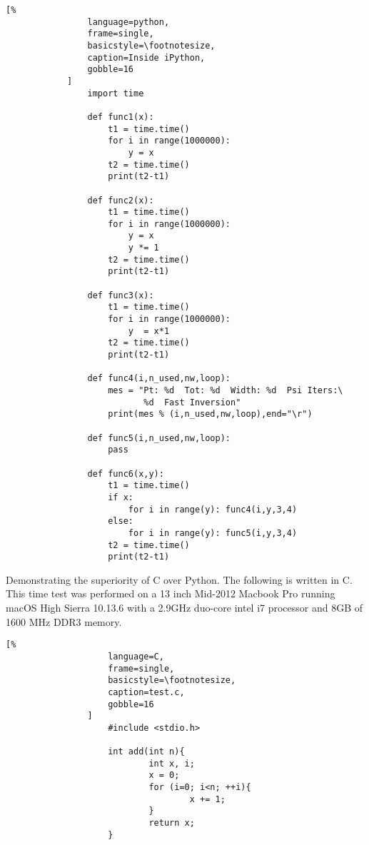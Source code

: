 \documentclass[crop=false,class=article,oneside]{standalone}
\begin{document}
            \begin{lstlisting}[%
                language=python,
                frame=single,
                basicstyle=\footnotesize,
                caption=Inside iPython,
                gobble=16
            ]
                import time
                
                def func1(x):
                	t1 = time.time()
                	for i in range(1000000):
                		y = x
                	t2 = time.time()
                	print(t2-t1)
                
                def func2(x):
                	t1 = time.time()
                	for i in range(1000000):
                		y = x
                		y *= 1
                	t2 = time.time()
                	print(t2-t1)
                
                def func3(x):
                    t1 = time.time()
                    for i in range(1000000):
                        y  = x*1
                    t2 = time.time()
                    print(t2-t1)
                
                def func4(i,n_used,nw,loop):
                    mes = "Pt: %d  Tot: %d  Width: %d  Psi Iters:\
                           %d  Fast Inversion"
                    print(mes % (i,n_used,nw,loop),end="\r")
                
                def func5(i,n_used,nw,loop):
                	pass
                
                def func6(x,y):
                	t1 = time.time()
                	if x:
                		for i in range(y): func4(i,y,3,4)
                	else:
                		for i in range(y): func5(i,y,3,4)
                	t2 = time.time()
                	print(t2-t1)
            \end{lstlisting}
            Demonstrating the superiority of C over Python.
            The following is written in C. This time test was
            performed on a 13 inch Mid-2012 Macbook Pro running macOS
            High Sierra 10.13.6 with a 2.9GHz duo-core intel i7
            processor and 8GB of 1600 MHz DDR3 memory.
            \newpage
            \begin{minipage}[t]{.48\textwidth}
                \centering
                \begin{lstlisting}[%
                    language=C,
                    frame=single,
                    basicstyle=\footnotesize,
                    caption=test.c,
                    gobble=16
                ]
                    #include <stdio.h>
                    
                    int add(int n){
                            int x, i;
                            x = 0;
                            for (i=0; i<n; ++i){
                                    x += 1;
                            }
                            return x;
                    }
                \end{lstlisting}
            \end{minipage}\hfill
\end{document}
